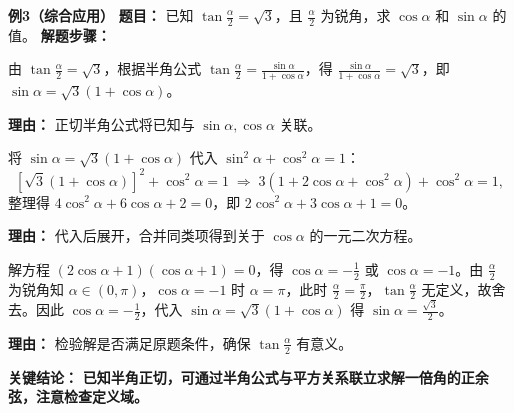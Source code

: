 \begin{examplebox}
	\medskip
	\textbf{\textcolor{CExample}{例3（综合应用）}}
	\textbf{\textcolor{CExample}{题目：}}
	已知 $\tan\frac{\alpha}{2} = \sqrt{3}$，且 $\frac{\alpha}{2}$ 为锐角，求 $\cos\alpha$ 和 $\sin\alpha$ 的值。
	\textbf{\textcolor{CExample}{解题步骤：}}
	\begin{description}[style=nextline, leftmargin=2.8em, labelsep=0.5em, itemsep=0.45em]
		\item[\textbf{第一步（使用正切半角公式建立方程）：}]
			由 $\tan\frac{\alpha}{2} = \sqrt{3}$，根据半角公式 $\tan\frac{\alpha}{2} = \frac{\sin\alpha}{1+\cos\alpha}$，得 $\frac{\sin\alpha}{1+\cos\alpha} = \sqrt{3}$，即 $\sin\alpha = \sqrt{3}(1+\cos\alpha)$。
			\par\textbf{理由：} 正切半角公式将已知与 $\sin\alpha,\cos\alpha$ 关联。
		\item[\textbf{第二步（联立平方关系求解）：}]
			将 $\sin\alpha = \sqrt{3}(1+\cos\alpha)$ 代入 $\sin^2\alpha+\cos^2\alpha=1$：
			\[
				\left[\sqrt{3}(1+\cos\alpha)\right]^2 + \cos^2\alpha = 1 \;\Longrightarrow\; 3(1+2\cos\alpha+\cos^2\alpha) + \cos^2\alpha = 1,
			\]
			整理得 $4\cos^2\alpha + 6\cos\alpha + 2 = 0$，即 $2\cos^2\alpha + 3\cos\alpha + 1 = 0$。
			\par\textbf{理由：} 代入后展开，合并同类项得到关于 $\cos\alpha$ 的一元二次方程。
		\item[\textbf{第三步（求解并检验）：}]
			解方程 $(2\cos\alpha+1)(\cos\alpha+1)=0$，得 $\cos\alpha = -\frac{1}{2}$ 或 $\cos\alpha = -1$。由 $\frac{\alpha}{2}$ 为锐角知 $\alpha\in(0,\pi)$，$\cos\alpha=-1$ 时 $\alpha=\pi$，此时 $\frac{\alpha}{2}=\frac{\pi}{2}$，$\tan\frac{\alpha}{2}$ 无定义，故舍去。因此 $\cos\alpha = -\frac{1}{2}$，代入 $\sin\alpha = \sqrt{3}(1+\cos\alpha)$ 得 $\sin\alpha = \frac{\sqrt{3}}{2}$。
			\par\textbf{理由：} 检验解是否满足原题条件，确保 $\tan\frac{\alpha}{2}$ 有意义。
	\end{description}
	\textbf{\textcolor{CExample}{关键结论：}}
	\textbf{已知半角正切，可通过半角公式与平方关系联立求解一倍角的正余弦，注意检查定义域。}
\end{examplebox}
